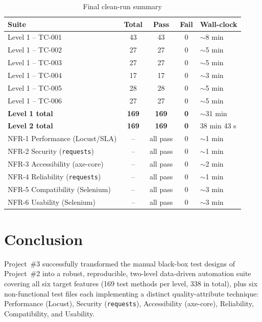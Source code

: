 \documentclass[twoside,final]{hcmut-report}
\begin{document}
\begin{table}[H]
\centering
\renewcommand{\arraystretch}{1.3}
\begin{tabularx}{\textwidth}{|l|c|c|c|X|}
\hline
\textbf{Suite} & \textbf{Total} & \textbf{Pass} & \textbf{Fail} & \textbf{Wall-clock} \\ \hline
Level 1 -- TC-001 & 43 & 43 & 0 & $\sim$8 min \\ \hline
Level 1 -- TC-002 & 27 & 27 & 0 & $\sim$5 min \\ \hline
Level 1 -- TC-003 & 27 & 27 & 0 & $\sim$5 min \\ \hline
Level 1 -- TC-004 & 17 & 17 & 0 & $\sim$3 min \\ \hline
Level 1 -- TC-005 & 28 & 28 & 0 & $\sim$5 min \\ \hline
Level 1 -- TC-006 & 27 & 27 & 0 & $\sim$5 min \\ \hline
\textbf{Level 1 total} & \textbf{169} & \textbf{169} & \textbf{0} & $\sim$31 min \\ \hline
\textbf{Level 2 total} & \textbf{169} & \textbf{169} & \textbf{0} & 38 min 43 s \\ \hline
NFR-1 Performance (Locust/SLA) & -- & all pass & 0 & $\sim$1 min \\ \hline
NFR-2 Security (\texttt{requests}) & -- & all pass & 0 & $\sim$1 min \\ \hline
NFR-3 Accessibility (axe-core) & -- & all pass & 0 & $\sim$2 min \\ \hline
NFR-4 Reliability (\texttt{requests}) & -- & all pass & 0 & $\sim$1 min \\ \hline
NFR-5 Compatibility (Selenium) & -- & all pass & 0 & $\sim$3 min \\ \hline
NFR-6 Usability (Selenium) & -- & all pass & 0 & $\sim$3 min \\ \hline
\end{tabularx}
\caption{Final clean-run summary}
\end{table}


\section{Conclusion}
Project~\#3 successfully transformed the manual black-box test designs of Project~\#2 into a robust, reproducible, two-level data-driven automation suite covering all six target features (169 test methods per level, 338 in total), plus six non-functional test files each implementing a distinct quality-attribute technique: Performance (Locust), Security (\texttt{requests}), Accessibility (axe-core), Reliability, Compatibility, and Usability.
\end{document}
